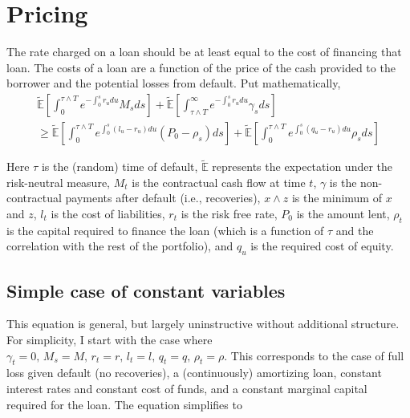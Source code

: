 \documentclass{article}
\begin{document}




\section{Pricing}


The rate charged on a loan should be at least equal to the cost of financing that loan.  The costs of a loan are a function of the price of the cash provided to the borrower and the potential losses from default.  Put mathematically, 
\begin{align*}
\mathbb{\tilde{E}}\left[ \int_0 ^ {\tau \wedge T} e^{-\int_0 ^ s r_u du} M_s ds \right]+\mathbb{\tilde{E}}\left[ \int_{\tau \wedge T} ^ \infty e^{-\int_0 ^ s r_u du} \gamma_s ds \right]\\ \geq 
\mathbb{\tilde{E}}\left[ \int_0 ^ {\tau \wedge T} e^{\int _ 0 ^ s \left(l_u-r_u \right) du} \left(P_0-\rho_s\right) ds \right]
+\mathbb{\tilde{E}}\left[ \int_0 ^ {\tau \wedge T} e^{\int _ 0 ^ s \left(q_u-r_u \right) du} \rho_s ds \right]
\end{align*}

Here \(\tau\) is the (random) time of default, \(\mathbb{\tilde{E}}\) represents the expectation under the risk-neutral measure, \(M_t\) is the contractual cash flow at time \(t\), \(\gamma\) is the non-contractual payments after default (i.e., recoveries), \(x \wedge z\) is the minimum of \(x\) and \(z\), \(l_t\) is the cost of liabilities, \(r_t\) is the risk free rate, \(P_0\) is the amount lent, \(\rho_t\) is the capital required to finance the loan (which is a function of \(\tau\) and the correlation with the rest of the portfolio), and \(q_u\) is the required cost of equity.
\subsection{Simple case of constant variables}
This equation is general, but largely uninstructive without additional structure.  For simplicity, I start with the case where \(\gamma_t = 0,\,M_s=M,\,r_t=r,\,l_t=l,\,q_t=q,\, \rho_t=\rho\).  This corresponds to the case of full loss given default (no recoveries), a (continuously) amortizing loan, constant interest rates and constant cost of funds, and a constant marginal capital required for the loan.  %
The equation simplifies to
\end{document}
